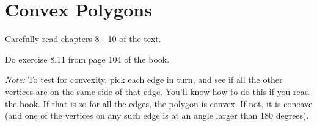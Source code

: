 \documentclass[11pt]{article}
\begin{document}




\section{Convex Polygons}

\exercise{} Carefully read chapters 8 - 10 of the text.

\exercise{} Do exercise 8.11 from page 104 of the book.

{\em{Note:}} To test for convexity, pick each edge in turn, and see if all the
other vertices are on the same side of that edge. You'll know how to do this if
you read the book. If that is so for all the edges, the polygon is convex. If
not, it is concave (and one of the vertices on any such edge is at an angle
larger than 180 degrees).
\end{document}

